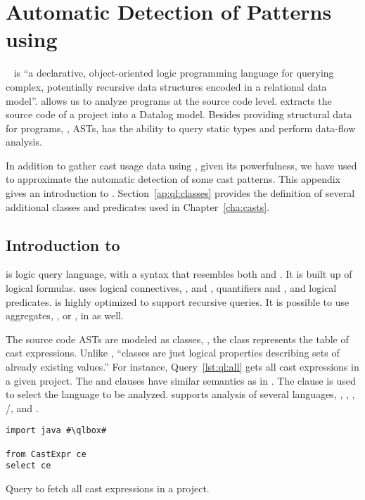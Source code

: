 \chapter{Automatic Detection of Patterns using \ql{}}\label{ap:ql}

\ql{}~\citep{avgustinovQLObjectorientedQueries2016} is ``a declarative, object-oriented logic programming language for querying complex,
potentially recursive data structures encoded in a relational data
model''.
\ql{} allows us to analyze programs at the source code level.
\ql{} extracts the source code of a project into a Datalog model.
Besides providing structural data for programs, \ie{}, ASTs,
\ql{} has the ability to query static types and perform data-flow analysis.

In addition to gather cast usage data using \ql{}, given its powerfulness,
we have used \ql{} to approximate the automatic detection of some cast patterns.
This appendix gives an introduction to \ql{}.
Section~\ref{ap:ql:classes} provides the definition of several additional classes and predicates used in Chapter~\ref{cha:casts}.

\section{Introduction to \ql{}}

\ql{} is logic query language,
with a syntax that resembles both \sql{} and \java{}.
It is built up of logical formulas.
\ql{} uses logical connectives, \eg{},  and ,
quantifiers  and , and logical predicates.
\ql{} is highly optimized to support recursive queries.
It is possible to use aggregates, \eg{},  or , in \ql{} as well.

The source code ASTs are modeled as \ql{} classes,
\eg{}, the  class represents the table of cast expressions.
Unlike \java{},
\ql{} ``classes are just logical properties describing sets of already existing values.''%
For instance, Query~\ref{lst:ql:all} gets all cast expressions in a given project.
The  and  clauses have similar semantics as in \sql{}.
The  clause is used to select the language to be analyzed.
\ql{} supports analysis of several languages,
\eg{}, \javascript{}, \python{}, \cc{}/\cpp{}, and \csharp{}.

\begin{listing}
\begin{verbatim}
import java #\qlbox#

from CastExpr ce
select ce
\end{verbatim}
\caption{Query to fetch all cast expressions in a project.}
\label{lst:ql:all}
\end{listing}

